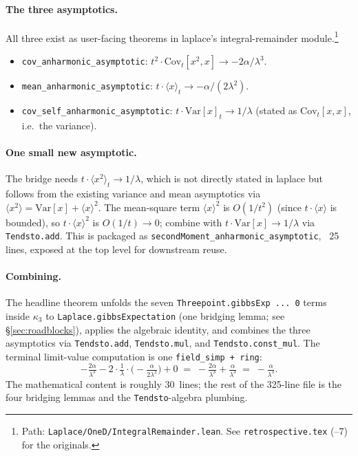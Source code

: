 \documentclass[11pt]{article}
\begin{document}
\paragraph{The three asymptotics.} All three exist as user-facing
theorems in laplace's integral-remainder module.\footnote{Path:
\texttt{Laplace/OneD/IntegralRemainder.lean}. See
\texttt{retrospective.tex} (--7) for the originals.}
\begin{itemize}
\item \texttt{cov\_anharmonic\_asymptotic}: $t^2 \cdot \mathrm{Cov}_t[x^2, x] \to -2\alpha/\lambda^3$.
\item \texttt{mean\_anharmonic\_asymptotic}: $t \cdot \langle x \rangle_t \to -\alpha/(2\lambda^2)$.
\item \texttt{cov\_self\_anharmonic\_asymptotic}: $t \cdot \mathrm{Var}[x]_t \to 1/\lambda$
(stated as $\mathrm{Cov}_t[x, x]$, i.e.\ the variance).
\end{itemize}

\paragraph{One small new asymptotic.} The bridge needs $t \cdot \langle x^2 \rangle_t \to 1/\lambda$,
which is not directly stated in laplace but follows from the existing
variance and mean asymptotics via $\langle x^2 \rangle = \mathrm{Var}[x] + \langle x \rangle^2$.
The mean-square term $\langle x \rangle^2$ is $O(1/t^2)$ (since $t \cdot \langle x \rangle$
is bounded), so $t \cdot \langle x \rangle^2$ is $O(1/t) \to 0$; combine
with $t \cdot \mathrm{Var}[x] \to 1/\lambda$ via \texttt{Tendsto.add}.
This is packaged as \texttt{secondMoment\_anharmonic\_asymptotic}, ~25
lines, exposed at the top level for downstream reuse.

\paragraph{Combining.} The headline theorem unfolds the seven
\texttt{Threepoint.gibbsExp~...~0} terms inside $\kappa_3$ to
\texttt{Laplace.gibbsExpectation} (one bridging lemma; see
\S\ref{sec:roadblocks}), applies the algebraic identity, and combines
the three asymptotics via \texttt{Tendsto.add}, \texttt{Tendsto.mul},
and \texttt{Tendsto.const\_mul}. The terminal limit-value computation
is one \texttt{field\_simp + ring}:
\[
  -\tfrac{2\alpha}{\lambda^3} - 2 \cdot \tfrac{1}{\lambda} \cdot \big(-\tfrac{\alpha}{2\lambda^2}\big) + 0
  \;=\; -\tfrac{2\alpha}{\lambda^3} + \tfrac{\alpha}{\lambda^3}
  \;=\; -\tfrac{\alpha}{\lambda^3}.
\]
The mathematical content is roughly 30~lines; the rest of the 325-line
file is the four bridging lemmas and the \texttt{Tendsto}-algebra
plumbing.
\end{document}
